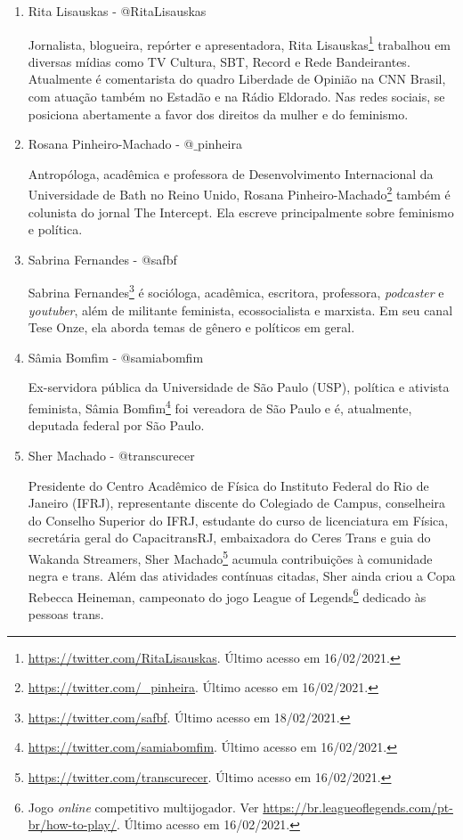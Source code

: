 \documentclass[
	12pt,				%
	openright,			%
	twoside,			%
	a4paper,			%
	english,			%
	brazil				%
	]{abntex2}
\begin{document}
\begin{anexosenv}
\begin{enumerate}
 \item Rita Lisauskas - @RitaLisauskas
 
 Jornalista, blogueira, repórter e apresentadora, Rita Lisauskas\footnote{\url{https://twitter.com/RitaLisauskas}. Último acesso em 16/02/2021.} trabalhou em diversas mídias como TV Cultura, SBT, Record e Rede Bandeirantes. Atualmente é comentarista do quadro Liberdade de Opinião na CNN Brasil, com atuação também no Estadão e na Rádio Eldorado. Nas redes sociais, se posiciona abertamente a favor dos direitos da mulher e do feminismo.

 \item Rosana Pinheiro-Machado - @$\_$pinheira
 
 Antropóloga, acadêmica e professora de Desenvolvimento Internacional da Universidade de Bath no Reino Unido, Rosana Pinheiro-Machado\footnote{\url{https://twitter.com/_pinheira}. Último acesso em 16/02/2021.} também é colunista do jornal The Intercept. Ela escreve principalmente sobre feminismo e política.

 \item Sabrina Fernandes - @safbf\label{sabfer}
 
 Sabrina Fernandes\footnote{\url{https://twitter.com/safbf}. Último acesso em 18/02/2021.} é socióloga, acadêmica, escritora, professora, \textit{podcaster} e \textit{youtuber}, além de militante feminista, ecossocialista e marxista. Em seu canal Tese Onze, ela aborda temas de gênero e políticos em geral.

 \item Sâmia Bomfim - @samiabomfim
 
 Ex-servidora pública da Universidade de São Paulo (USP), política e ativista feminista, Sâmia Bomfim\footnote{\url{https://twitter.com/samiabomfim}. Último acesso em 16/02/2021.} foi vereadora de São Paulo e é, atualmente, deputada federal por São Paulo.

 \item Sher Machado - @transcurecer
 
 Presidente do Centro Acadêmico de Física do Instituto Federal do Rio de Janeiro (IFRJ), representante discente do Colegiado de Campus, conselheira do Conselho Superior do IFRJ, estudante do curso de licenciatura em Física, secretária geral do CapacitransRJ, embaixadora do Ceres Trans e guia do Wakanda Streamers, Sher Machado\footnote{\url{https://twitter.com/transcurecer}. Último acesso em 16/02/2021.} acumula contribuições à comunidade negra e trans. Além das atividades contínuas citadas, Sher ainda criou a Copa Rebecca Heineman, campeonato do jogo League of Legends\footnote{Jogo \textit{online} competitivo multijogador. Ver \url{https://br.leagueoflegends.com/pt-br/how-to-play/}. Último acesso em 16/02/2021.} dedicado às pessoas trans.


\end{enumerate}
\end{anexosenv}
\end{document}
